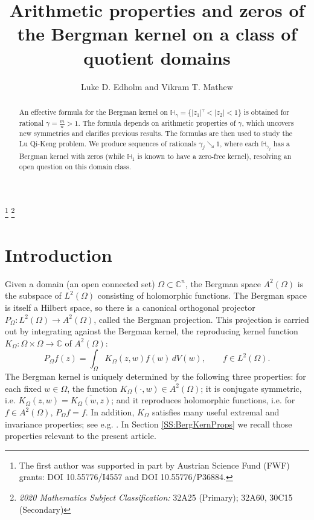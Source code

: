 \documentclass[letterpaper,11pt,reqno]{amsart}
\theoremstyle{plain}
\theoremstyle{definition}
\theoremstyle{remark}
\theoremstyle{remark}
\numberwithin{equation}{section}
\newcommand{\ol}{\overline}
\newcommand{\C}{{\mathbb C}}
\newcommand{\h}{{\mathbb H}}
\begin{document}
\title[Arithmetic properties and zeros of the Bergman kernel]{Arithmetic properties and zeros of the Bergman kernel on a class of quotient domains}

\author{Luke D. Edholm and Vikram T. Mathew}

\begin{abstract}
An effective formula for the Bergman kernel on $\h_{\gamma} = \{|z_1|^\gamma < |z_2| < 1 \}$ is obtained for rational $\gamma = \frac{m}{n} >1$.
The formula depends on arithmetic properties of $\gamma$, which uncovers new symmetries and clarifies previous results.
The formulas are then used to study the Lu Qi-Keng problem. 
We produce sequences of rationals $\gamma_j \searrow 1$, where each $\h_{\gamma_j}$ has a Bergman kernel with zeros (while $\h_1$ is known to have a zero-free kernel), resolving an open question on this domain class. 
\end{abstract}

\thanks{The first author was supported in part by Austrian Science Fund (FWF) grants: DOI 10.55776/I4557 and DOI 10.55776/P36884.}
\thanks{{\em 2020 Mathematics Subject Classification:}  32A25 (Primary); 32A60, 30C15 (Secondary)}
\address{Department of Mathematics\\Universit\"at Wien, Vienna, Austria}
\address{Department of Industrial Engineering and Operations Research\\Columbia University, New York, New York}

\maketitle

\section{Introduction}

Given a domain (an open connected set) $\Omega \subset \C^n$, the Bergman space $A^2(\Omega)$ is the subspace of $L^2(\Omega)$ consisting of holomorphic functions.
The Bergman space is itself a Hilbert space, so there is a canonical orthogonal projector $P_\Omega: L^2(\Omega) \to A^2(\Omega)$, called the Bergman projection.
This projection is carried out by integrating against the Bergman kernel, the reproducing kernel function $K_\Omega : \Omega \times \Omega \to \C$ of $A^2(\Omega)$:
\begin{equation}\label{E:def-of;Bergman-proj}
P_\Omega f(z) = \int_\Omega K_\Omega(z,w) f(w)\,dV(w), \qquad f\in L^2(\Omega).
\end{equation}
The Bergman kernel is uniquely determined by the following three properties: for each fixed $w \in \Omega$, the function $K_\Omega(\cdot,w) \in A^2(\Omega)$; it is conjugate symmetric, i.e. $K_\Omega(z,w) = \ol{K_\Omega(w,z)}$; and it reproduces holomorphic functions, i.e. for $f \in A^2(\Omega)$, $P_\Omega f=f$.
In addition, $K_\Omega$ satisfies many useful extremal and invariance properties; see e.g. \cite{bergmanbook,Krantz_scv_book,JarPflBook08,Krantz_BergmanBook1_2013}.
In Section \ref{SS:BergKernProps} we recall those properties relevant to the present article.
\end{document}
